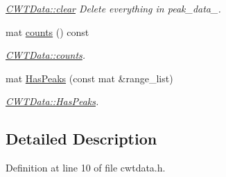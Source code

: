 \begin{DoxyCompactItemize}
\begin{DoxyCompactList}\small\item\em \hyperlink{class_c_w_t_data_a95b94433d6244a37cdee0205a67b0321}{C\+W\+T\+Data\+::clear} Delete everything in peak\+\_\+data\+\_\+. \end{DoxyCompactList}\item 
mat \hyperlink{class_c_w_t_data_a829d9ca8cdabff46dd3654f2bda64899}{counts} () const 
\begin{DoxyCompactList}\small\item\em \hyperlink{class_c_w_t_data_a829d9ca8cdabff46dd3654f2bda64899}{C\+W\+T\+Data\+::counts}. \end{DoxyCompactList}\item 
mat \hyperlink{class_c_w_t_data_acfc35d0f61d67aedc7bf2fed91de1319}{Has\+Peaks} (const mat \&range\+\_\+list)
\begin{DoxyCompactList}\small\item\em \hyperlink{class_c_w_t_data_acfc35d0f61d67aedc7bf2fed91de1319}{C\+W\+T\+Data\+::\+Has\+Peaks}. \end{DoxyCompactList}\end{DoxyCompactItemize}


\subsection{Detailed Description}


Definition at line 10 of file cwtdata.\+h.



